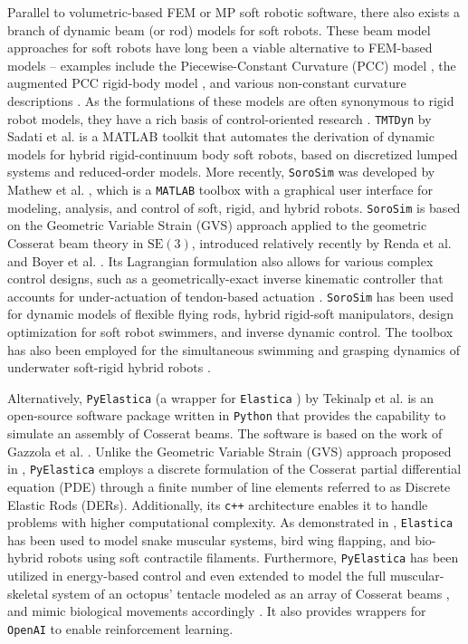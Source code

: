 Parallel to volumetric-based FEM or MP soft robotic software, there also exists a branch of dynamic beam (or rod) models for soft robots. These beam model approaches for soft robots have long been a viable alternative to FEM-based models -- examples include the Piecewise-Constant Curvature (PCC) model \cite{Falkenhahn2015,Stolzle2021,Caasenbrood2022}, the augmented PCC rigid-body model \cite{DellaSantina2020,Trumic2020,Kazemipour2022}, and various non-constant curvature descriptions \cite{DellaSantina2020,Wang2022Mar,Boyer2021,Renda2020}. As the formulations of these models are often synonymous to rigid robot models, they have a rich basis of control-oriented research \cite{Borja2022Apr,Pustina2022,Caasenbrood2022,Fischer2022}. \texttt{TMTDyn} by Sadati et al. \cite{Sadati2020} is a MATLAB toolkit that automates the derivation of dynamic models for hybrid rigid-continuum body soft robots, based on discretized lumped systems and reduced-order models. More recently, \texttt{SoroSim} was developed by Mathew et al. \cite{Mathew2022}, which is a \texttt{MATLAB} toolbox with a graphical user interface for modeling, analysis, and control of soft, rigid, and hybrid robots. \texttt{SoroSim} is based on the Geometric Variable Strain (GVS) approach applied to the geometric Cosserat beam theory in $\textrm{SE}(3)$, introduced relatively recently by Renda et al. \cite{Renda2020} and Boyer et al. \cite{Boyer2021}. Its Lagrangian formulation also allows for various complex control designs, such as a geometrically-exact inverse kinematic controller that accounts for under-actuation of tendon-based actuation \cite{Mathew2022}. \texttt{SoroSim} has been used for dynamic models of flexible flying rods, hybrid rigid-soft manipulators, design optimization for soft robot swimmers, and inverse dynamic control. The toolbox has also been employed for the simultaneous swimming and grasping dynamics of underwater soft-rigid hybrid robots \cite{Mathew2022Oct}.

Alternatively, \texttt{PyElastica} (a wrapper for \texttt{Elastica} \cite{Naughton2021}) by Tekinalp et al. \cite{Tekinalp2022} is an open-source software package written in \texttt{Python} that provides the capability to simulate an assembly of Cosserat beams. The software is based on the work of Gazzola et al. \cite{Gazzola2018}. Unlike the Geometric Variable Strain (GVS) approach proposed in \cite{Renda2020,Boyer2021,Mathew2022}, \texttt{PyElastica} employs a discrete formulation of the Cosserat partial differential equation (PDE) through a finite number of line elements referred to as Discrete Elastic Rods (DERs). Additionally, its \texttt{c++} architecture enables it to handle problems with higher computational complexity. As demonstrated in \cite{Zhang2019}, \texttt{Elastica} has been used to model snake muscular systems, bird wing flapping, and bio-hybrid robots using soft contractile filaments. Furthermore, \texttt{PyElastica} has been utilized in energy-based control and even extended to model the full muscular-skeletal system of an octopus' tentacle modeled as an array of Cosserat beams \cite{Chang2022}, and mimic biological movements accordingly \cite{Wang2022Dec}. It also provides wrappers for \texttt{OpenAI} to enable reinforcement learning.

